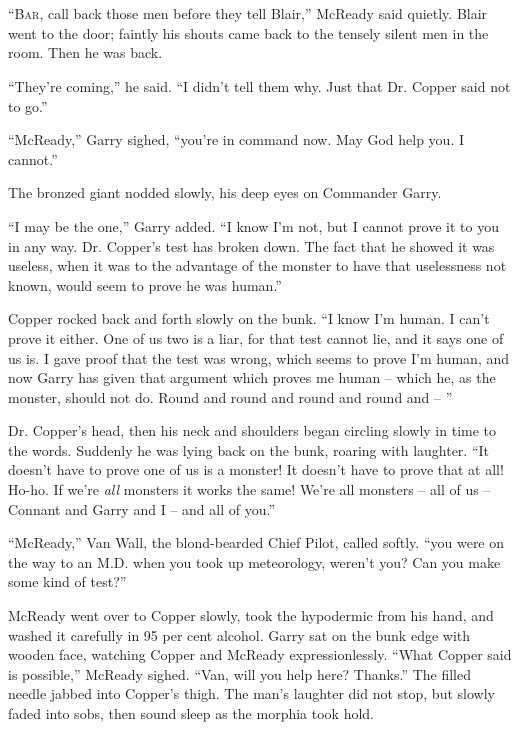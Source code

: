 \documentclass[letterpaper,openany,12pt]{memoir}		%
\begin{document}
\chapter[Chapter 9]{}

\lettrine[lines=3,findent=2pt,nindent=2pt]{``B}{ar}, call back those men before
they tell Blair,'' McReady said quietly. Blair went to the door; faintly his
shouts came back to the tensely silent men in the room. Then he was back.

``They're coming,'' he said. ``I didn't tell them why. Just that Dr. Copper said
not to go.''

``McReady,'' Garry sighed, ``you're in command now. May God help you. I
cannot.''

The bronzed giant nodded slowly, his deep eyes on Commander Garry.

``I may be the one,'' Garry added. ``I know I'm not, but I cannot prove it to
you in any way. Dr. Copper's test has broken down. The fact that he showed it
was useless, when it was to the advantage of the monster to have that
uselessness not known, would seem to prove he was human.''

Copper rocked back and forth slowly on the bunk. ``I know I'm human. I can't
prove it either. One of us two is a liar, for that test cannot lie, and it says
one of us is. I gave proof that the test was wrong, which seems to prove I'm
human, and now Garry has given that argument which proves me human -- which he,
as the monster, should not do. Round and round and round and round and -- ''

Dr. Copper's head, then his neck and shoulders began circling slowly in time to
the words. Suddenly he was lying back on the bunk, roaring with laughter. ``It
doesn't have to prove one of us is a monster! It doesn't have to prove that at
all! Ho-ho. If we're \emph{all} monsters it works the same! We're all monsters
-- all of us -- Connant and Garry and I -- and all of you.''

``McReady,'' Van Wall, the blond-bearded Chief Pilot, called softly. ``you were
on the way to an M.D. when you took up meteorology, weren't you? Can you make
some kind of test?''

McReady went over to Copper slowly, took the hypodermic from his hand, and
washed it carefully in 95 per cent alcohol. Garry sat on the bunk edge with
wooden face, watching Copper and McReady expressionlessly. ``What Copper said is
possible,'' McReady sighed. ``Van, will you help here? Thanks.'' The filled
needle jabbed into Copper's thigh. The man's laughter did not stop, but slowly
faded into sobs, then sound sleep as the morphia took hold.
\end{document}
